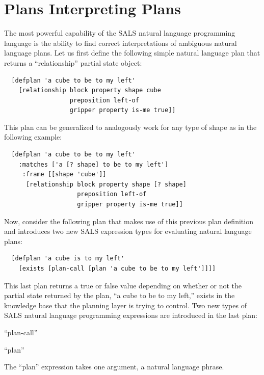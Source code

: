 \section{Plans Interpreting Plans}
\label{section:plans_interpreting_plans}

The most powerful capability of the SALS natural language programming
language is the ability to find correct interpretations of ambiguous
natural language plans.  Let us first define the following simple
natural language plan that returns a ``relationship'' partial state
object:
\begin{samepage}
\begin{Verbatim}
  [defplan 'a cube to be to my left'
    [relationship block property shape cube
                  preposition left-of
                  gripper property is-me true]]
\end{Verbatim}
\end{samepage}
This plan can be generalized to analogously work for any type of shape
as in the following example:
\begin{samepage}
\begin{Verbatim}
  [defplan 'a cube to be to my left'
    :matches ['a [? shape] to be to my left']
     :frame [[shape 'cube']]
      [relationship block property shape [? shape]
                    preposition left-of
                    gripper property is-me true]]
\end{Verbatim}
\end{samepage}
Now, consider the following plan that makes use of this previous plan
definition and introduces two new SALS expression types for evaluating
natural language plans:
\begin{samepage}
\begin{Verbatim}
  [defplan 'a cube is to my left'
    [exists [plan-call [plan 'a cube to be to my left']]]]
\end{Verbatim}
\end{samepage}
This last plan returns a true or false value depending on whether or
not the partial state returned by the plan, ``a cube to be to my
left,'' exists in the knowledge base that the planning layer is trying
to control.  Two new types of SALS natural language programming
expressions are introduced in the last plan:
\begin{packed_enumerate}
\item{``plan-call''}
\item{``plan''}
\end{packed_enumerate}
The ``plan'' expression takes one argument, a natural language phrase.
